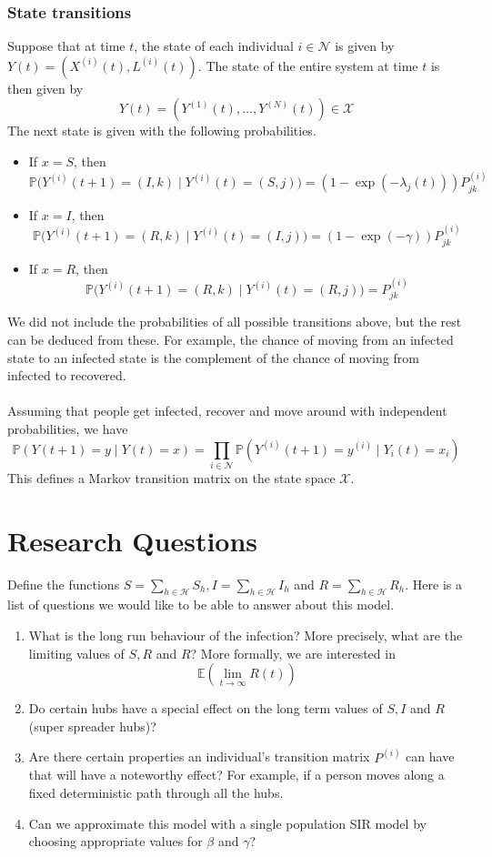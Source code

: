 \documentclass[a4paper]{article}
\begin{document}
	\subsubsection{State transitions}
	Suppose that at time $t$, the state of each individual $i \in \mathcal{N}$ is given by $Y(t) = (X^{(i)}(t), L^{(i)}(t))$. The state of the entire system at time $t$ is then given by
	$$Y(t) = (Y^{(1)}(t), \dots, Y^{(N)}(t)) \in \mathcal{X}$$
	The next state is given with the following probabilities.
	\begin{itemize}
		\item If $x = S$, then 
		$$\mathbb{P}\bigl(Y^{(i)}(t+1) = (I,k) \mid Y^{(i)}(t) = (S,j)\bigr) = (1 - \exp(-\lambda_{j}(t)))P_{jk}^{(i)}$$
		\item If $x = I$, then 
		$$\mathbb{P}\bigl(Y^{(i)}(t+1) = (R,k) \mid Y^{(i)}(t) = (I,j)\bigr) = (1 - \exp(-\gamma)) P_{jk}^{(i)}$$
		\item If $x = R$, then 
		$$\mathbb{P}\bigl(Y^{(i)}(t+1) = (R,k) \mid Y^{(i)}(t) = (R,j)\bigr) =  P_{jk}^{(i)}$$
	\end{itemize}
	We did not include the probabilities of all possible transitions above, but the rest can be deduced from these. For example, the chance of moving from an infected state to an infected state is the complement of the chance of moving from infected to recovered.\\\\
	Assuming that people get infected, recover and move around with independent probabilities, we have
	$$\mathbb{P}(Y(t + 1) = y \mid Y(t) = x) = \prod_{i \in \mathcal{N}}\mathbb{P}(Y^{(i)}(t + 1) = y^{(i)} \mid Y_{i}(t) = x_{i})$$
	This defines a Markov transition matrix on the state space $\mathcal{X}$.
	\section{Research Questions}
	Define the functions $S = \sum_{h \in \mathcal{H}}S_{h}, I = \sum_{h \in \mathcal{H}}I_{h}$ and $R = \sum_{h \in \mathcal{H}}R_{h}$. Here is a list of questions we would like to be able to answer about this model.
	\begin{enumerate}
		\item What is the long run behaviour of the infection? More precisely, what are the limiting values of $S, R$ and $R$? More formally, we are interested in
		$$\mathbb{E}(\lim_{t \to \infty}R(t))$$
		\item Do certain hubs have a special effect on the long term values of $S, I$ and $R$ (super spreader hubs)?
		\item Are there certain properties an individual's transition matrix $P^{(i)}$ can have that will have a noteworthy effect? For example, if a person moves along a fixed deterministic path through all the hubs.
		\item Can we approximate this model with a single population SIR model by choosing appropriate values for $\beta$ and $\gamma$?
	\end{enumerate}
\end{document}
